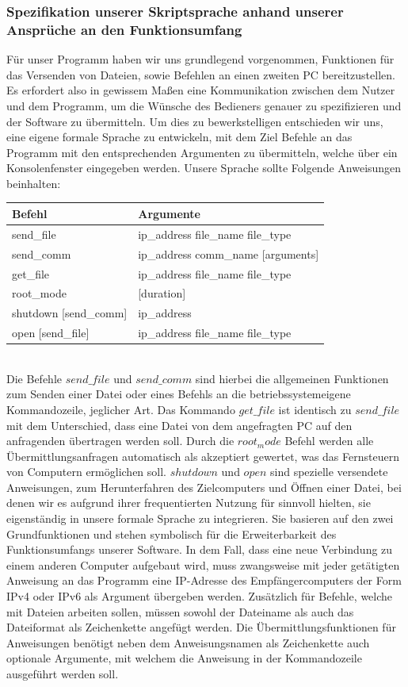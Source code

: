 \subsubsection{Spezifikation unserer Skriptsprache anhand unserer Ansprüche an den Funktionsumfang}
Für unser Programm haben wir uns grundlegend vorgenommen, Funktionen für das Versenden von Dateien, sowie Befehlen an einen zweiten PC bereitzustellen. Es erfordert also in gewissem Maßen eine Kommunikation zwischen dem Nutzer und dem Programm, um die Wünsche des Bedieners genauer zu spezifizieren und der Software zu übermitteln. Um dies zu bewerkstelligen entschieden wir uns, eine eigene formale Sprache zu entwickeln, mit dem Ziel Befehle an das Programm mit den entsprechenden Argumenten zu übermitteln, welche über ein Konsolenfenster eingegeben werden.
Unsere Sprache sollte Folgende Anweisungen beinhalten:\\
\begin{table}[h!]
\centering
\begin{tabular}{|ll|}
\hline
Befehl & Argumente \\ \hline
send\_file & ip\_address file\_name file\_type \\
send\_comm & ip\_address comm\_name {[}arguments{]} \\
get\_file & ip\_address file\_name file\_type \\
root\_mode & [duration]\\
shutdown [send\_comm] & ip\_address \\
open [send\_file] & ip\_address file\_name file\_type \\ \hline
\end{tabular}
\end{table}\\
Die Befehle $send\_file$ und $send\_comm$ sind hierbei die allgemeinen Funktionen zum Senden einer Datei oder eines Befehls an die betriebssystemeigene Kommandozeile, jeglicher Art. Das Kommando $get\_file$ ist identisch zu $send\_file$ mit dem Unterschied, dass eine Datei von dem angefragten PC auf den anfragenden übertragen werden soll.
Durch die $root_mode$ Befehl werden alle Übermittlungsanfragen automatisch als akzeptiert gewertet, was das Fernsteuern von Computern ermöglichen soll.
$shutdown$ und $open$ sind spezielle versendete Anweisungen, zum Herunterfahren des Zielcomputers und Öffnen einer Datei, bei denen wir es aufgrund ihrer frequentierten Nutzung für sinnvoll hielten, sie eigenständig in unsere formale Sprache zu integrieren. Sie basieren auf den zwei Grundfunktionen und stehen symbolisch für die Erweiterbarkeit des Funktionsumfangs unserer Software. In dem Fall, dass eine neue Verbindung zu einem anderen Computer aufgebaut wird, muss zwangsweise mit jeder getätigten Anweisung an das Programm eine IP-Adresse des Empfängercomputers der Form IPv4 oder IPv6 als Argument übergeben werden. Zusätzlich für Befehle, welche mit Dateien arbeiten sollen, müssen sowohl der Dateiname als auch das Dateiformat als Zeichenkette angefügt werden. Die Übermittlungsfunktionen für Anweisungen benötigt neben dem Anweisungsnamen als Zeichenkette auch optionale Argumente, mit welchem die Anweisung in der Kommandozeile ausgeführt werden soll.\\
